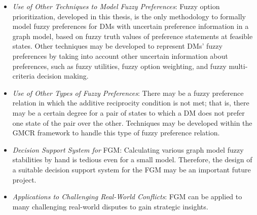 \begin{itemize}
  \item \emph{Use of Other Techniques to Model Fuzzy Preferences}: Fuzzy option prioritization, developed in this thesis, is the only methodology to formally model fuzzy preferences for DMs with uncertain preference information in a graph model, based on fuzzy truth values of preference statements at feasible states. Other techniques may be developed to represent DMs' fuzzy preferences by taking into account other uncertain information about preferences, such as fuzzy utilities, fuzzy option weighting, and fuzzy multi-criteria decision making.
  \item \emph{Use of Other Types of Fuzzy Preferences}: There may be a fuzzy preference relation in which the additive reciprocity condition is not met; that is, there may be a certain degree for a pair of states to which a DM does not prefer one state of the pair over the other. Techniques may be developed within the GMCR framework to handle this type of fuzzy preference relation.
  \item \emph{Decision Support System for} FGM: Calculating various graph model fuzzy stabilities by hand is tedious even for a small model. Therefore, the design of a suitable decision support system for the FGM may be an important future project.
  \item \emph{Applications to Challenging Real-World Conflicts}: FGM can be applied to many challenging real-world disputes to gain strategic insights.
\end{itemize}

